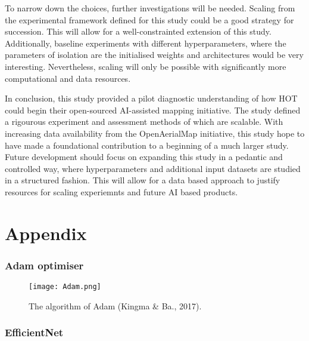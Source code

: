 \documentclass[11pt, a4paper, twoside]{report}
\begin{document}
To narrow down the choices, further investigations will be needed. Scaling from the experimental framework defined for this study could be a good strategy for succession. This will allow for a well-constrainted extension of this study. Additionally, baseline experiments with different hyperparameters, where the parameters of isolation are the initialised weights and architectures would  be very interesting. Nevertheless, scaling will only be possible with significantly more computational and data resources.\\\par

In conclusion, this study provided a pilot diagnostic understanding of how HOT could begin their open-sourced AI-assisted mapping initiative. The study defined a rigourous experiment and assessment methods of which are scalable. With increasing data availability from the OpenAerialMap initiative, this study hope to have made a foundational contribution to a beginning of a much larger study. Future development should focus on expanding this study in a pedantic and controlled way, where hyperparameters and additional input datasets are studied in a structured fashion. This will allow for a data based approach to justify resources for scaling experiemnts and future AI based products.\\\par

\newpage

\printbibliography[
  heading=bibintoc,
  title={Bibliography}
]

\newpage

\chapter{Appendix}\label{Appen}

\subsection{Adam optimiser}\label{Adam}

\begin{figure}[H]
  \centering
  \texttt{[image: Adam.png]}
  \caption{The algorithm of Adam (Kingma \& Ba., 2017).}
  \label{app:Adam}
\end{figure}

\subsection{EfficientNet}\label{Eff-Net}
\end{document}
